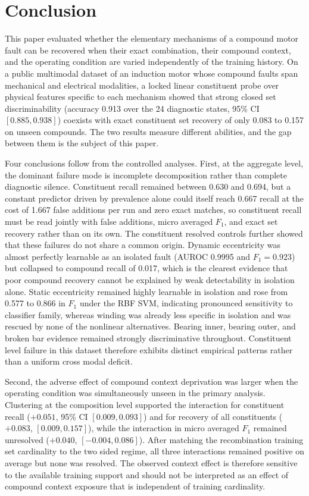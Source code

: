 \section{Conclusion}
\label{sec:conclusion}

This paper evaluated whether the elementary mechanisms of a compound motor
fault can be recovered when their exact combination, their compound context,
and the operating condition are varied independently of the training history.
On a public multimodal dataset of an induction motor whose compound faults
span mechanical and electrical modalities, a locked linear constituent probe
over physical features specific to each mechanism showed that strong closed
set discriminability (accuracy 0.913 over the 24 diagnostic states, 95\% CI
$[0.885, 0.938]$) coexists with exact constituent set recovery of only 0.083
to 0.157 on unseen compounds. The two results measure different abilities,
and the gap between them is the subject of this paper.

Four conclusions follow from the controlled analyses. First, at the aggregate
level, the dominant failure mode is incomplete decomposition rather than
complete diagnostic silence. Constituent recall remained between 0.630 and
0.694, but a constant predictor driven by prevalence alone could itself reach
0.667 recall at the cost of 1.667 false additions per run and zero exact
matches, so constituent recall must be read jointly with false additions,
micro averaged $F_1$, and exact set recovery rather than on its own. The constituent resolved controls
further showed that these failures do not share a common origin. Dynamic
eccentricity was almost perfectly learnable as an isolated fault (AUROC
0.9995 and $F_1 = 0.923$) but collapsed to compound recall of 0.017, which is
the clearest evidence that poor compound recovery cannot be explained by weak
detectability in isolation alone. Static eccentricity remained highly
learnable in isolation and rose from 0.577 to 0.866 in $F_1$ under the RBF
SVM, indicating pronounced sensitivity to classifier family, whereas winding
was already less specific in isolation and was rescued by none of the
nonlinear alternatives. Bearing inner, bearing outer, and broken bar evidence
remained strongly discriminative throughout. Constituent level failure in
this dataset therefore exhibits distinct empirical patterns rather than a
uniform cross modal deficit.

Second, the adverse effect of compound context deprivation was larger when
the operating condition was simultaneously unseen in the primary analysis.
Clustering at the composition level supported the interaction for constituent
recall ($+0.051$, 95\% CI $[0.009, 0.093]$) and for recovery of all
constituents ($+0.083$, $[0.009, 0.157]$), while the interaction in micro
averaged $F_1$ remained unresolved ($+0.040$, $[-0.004, 0.086]$). After
matching the recombination training set cardinality to the two sided regime,
all three interactions remained positive on average but none was resolved.
The observed context effect is therefore sensitive to the available training
support and should not be interpreted as an effect of compound context
exposure that is independent of training cardinality.

